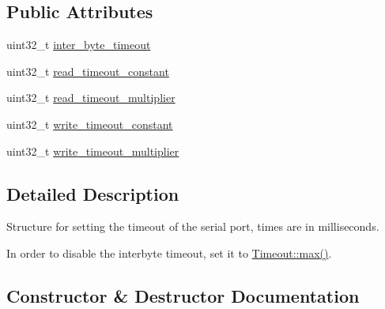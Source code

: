 \subsection*{Public Attributes}
\begin{DoxyCompactItemize}
\item 
uint32\+\_\+t \mbox{\hyperlink{structserial_1_1_timeout_ada15f2a0ae478cbb62ef79d1633b2b81}{inter\+\_\+byte\+\_\+timeout}}
\item 
uint32\+\_\+t \mbox{\hyperlink{structserial_1_1_timeout_a099244649dec66b6e0548480edeb2b9f}{read\+\_\+timeout\+\_\+constant}}
\item 
uint32\+\_\+t \mbox{\hyperlink{structserial_1_1_timeout_a64412753eb2edf1621716dd9f1a4e71e}{read\+\_\+timeout\+\_\+multiplier}}
\item 
uint32\+\_\+t \mbox{\hyperlink{structserial_1_1_timeout_accf01b97f83564f4ce3d6e5f63e21006}{write\+\_\+timeout\+\_\+constant}}
\item 
uint32\+\_\+t \mbox{\hyperlink{structserial_1_1_timeout_a31ddae32907cff9c3d27fa763981317d}{write\+\_\+timeout\+\_\+multiplier}}
\end{DoxyCompactItemize}


\subsection{Detailed Description}
Structure for setting the timeout of the serial port, times are in milliseconds.

In order to disable the interbyte timeout, set it to \mbox{\hyperlink{structserial_1_1_timeout_adc68e33d2f94bfa33ba1062c363b9151}{Timeout\+::max()}}. 

\subsection{Constructor \& Destructor Documentation}
\mbox{\label{structserial_1_1_timeout_a1a454b17f5d653b8e1b04b3ec2fead59}} 
